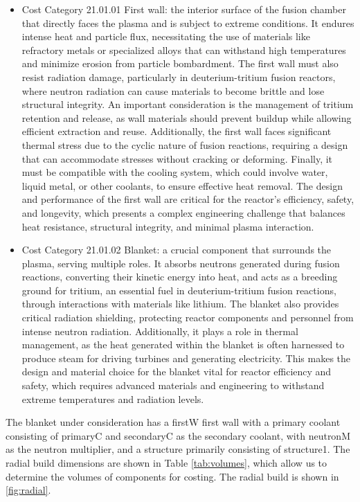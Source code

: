 \begin{itemize}
    \item Cost Category 21.01.01 First wall: the interior surface of the fusion chamber that directly faces the plasma and is subject to extreme conditions. It endures intense heat and particle flux, necessitating the use of materials like refractory metals or specialized alloys that can withstand high temperatures and minimize erosion from particle bombardment. The first wall must also resist radiation damage, particularly in deuterium-tritium fusion reactors, where neutron radiation can cause materials to become brittle and lose structural integrity. An important consideration is the management of tritium retention and release, as wall materials should prevent buildup while allowing efficient extraction and reuse. Additionally, the first wall faces significant thermal stress due to the cyclic nature of fusion reactions, requiring a design that can accommodate stresses without cracking or deforming. Finally, it must be compatible with the cooling system, which could involve water, liquid metal, or other coolants, to ensure effective heat removal. The design and performance of the first wall are critical for the reactor's efficiency, safety, and longevity, which presents a complex engineering challenge that balances heat resistance, structural integrity, and minimal plasma interaction.
    \item Cost Category 21.01.02 Blanket: a crucial component that surrounds the plasma, serving multiple roles. It absorbs neutrons generated during fusion reactions, converting their kinetic energy into heat, and acts as a breeding ground for tritium, an essential fuel in deuterium-tritium fusion reactions, through interactions with materials like lithium. The blanket also provides critical radiation shielding, protecting reactor components and personnel from intense neutron radiation. Additionally, it plays a role in thermal management, as the heat generated within the blanket is often harnessed to produce steam for driving turbines and generating electricity. This makes the design and material choice for the blanket vital for reactor efficiency and safety, which requires advanced materials and engineering to withstand extreme temperatures and radiation levels.
\end{itemize}

The blanket under consideration has a firstW first wall with a primary coolant consisting of primaryC and secondaryC as the secondary coolant, with neutronM as the neutron multiplier, and a structure primarily consisting of structure1. The radial build dimensions are shown in Table \ref{tab:volumes}, which allow us to determine the volumes of components for costing.  The radial build is shown in \ref{fig:radial}.  \\


